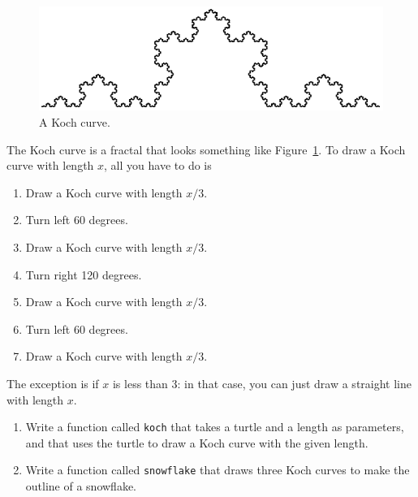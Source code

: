 \documentclass[10pt]{book}
\begin{document}
\begin{CJK}{UTF8}{gbsn}
\begin{figure}
\centerline
{\includegraphics[scale=0.8]{figs/koch.pdf}}
\caption{A Koch curve.}
\label{fig.koch}
\end{figure}

\begin{exercise}

The Koch curve is a fractal that looks something like
Figure~\ref{fig.koch}.  To draw a Koch curve with length $x$, all you
have to do is

\begin{enumerate}

\item Draw a Koch curve with length $x/3$.

\item Turn left 60 degrees.

\item Draw a Koch curve with length $x/3$.

\item Turn right 120 degrees.

\item Draw a Koch curve with length $x/3$.

\item Turn left 60 degrees.

\item Draw a Koch curve with length $x/3$.

\end{enumerate}

The exception is if $x$ is less than 3: in that case,
you can just draw a straight line with length $x$.

\begin{enumerate}

\item Write a function called {\tt koch} that takes a turtle and
a length as parameters, and that uses the turtle to draw a Koch
curve with the given length.

\item Write a function called {\tt snowflake} that draws three
Koch curves to make the outline of a snowflake.


\end{enumerate}
\end{exercise}
\end{CJK}
\end{document}
